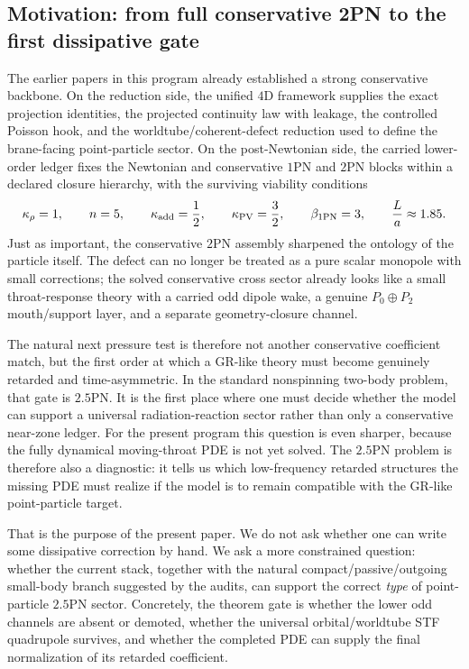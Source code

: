 \documentclass[11pt]{article}
\begin{document}
\subsection{Motivation: from full conservative 2PN to the first dissipative gate}
\label{sec:intro-motivation}

The earlier papers in this program already established a strong conservative
backbone.  On the reduction side, the unified $4$D framework supplies the exact
projection identities, the projected continuity law with leakage, the controlled
Poisson hook, and the worldtube/coherent-defect reduction used to define the
brane-facing point-particle sector.  On the post-Newtonian side, the carried
lower-order ledger fixes the Newtonian and conservative $1$PN and $2$PN blocks
within a declared closure hierarchy, with the surviving viability conditions
\[
\kappa_\rho = 1,
\qquad
n = 5,
\qquad
\kappa_{\rm add} = \frac{1}{2},
\qquad
\kappa_{\rm PV} = \frac{3}{2},
\qquad
\beta_{\rm 1PN} = 3,
\qquad
\frac{L}{a} \approx 1.85.
\]
Just as important, the conservative $2$PN assembly sharpened the ontology of the
particle itself.  The defect can no longer be treated as a pure scalar monopole
with small corrections; the solved conservative cross sector already looks like a
small throat-response theory with a carried odd dipole wake, a genuine
$P_0\oplus P_2$ mouth/support layer, and a separate geometry-closure channel.

The natural next pressure test is therefore not another conservative coefficient
match, but the first order at which a GR-like theory must become genuinely
retarded and time-asymmetric.  In the standard nonspinning two-body problem,
that gate is $2.5$PN.  It is the first place where one must decide whether the
model can support a universal radiation-reaction sector rather than only a
conservative near-zone ledger.  For the present program this question is even
sharper, because the fully dynamical moving-throat PDE is not yet solved.  The
$2.5$PN problem is therefore also a diagnostic: it tells us which low-frequency
retarded structures the missing PDE must realize if the model is to remain
compatible with the GR-like point-particle target.

That is the purpose of the present paper.  We do not ask whether one can write
some dissipative correction by hand.  We ask a more constrained question:
whether the current stack, together with the natural compact/passive/outgoing
small-body branch suggested by the audits, can support the correct \emph{type} of
point-particle $2.5$PN sector.  Concretely, the theorem gate is whether the
lower odd channels are absent or demoted, whether the universal orbital/worldtube
STF quadrupole survives, and whether the completed PDE can supply the final
normalization of its retarded coefficient.
\end{document}
